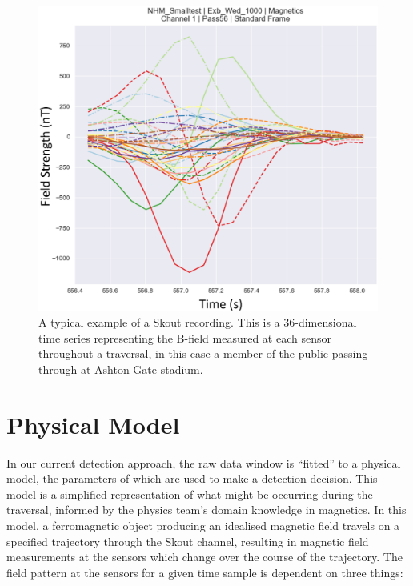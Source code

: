 \documentclass[10pt, a4paper, twocolumn]{article} %
\begin{document}
\begin{figure}
	\includegraphics[width=\linewidth]{Figures/example_data.png} %
	\caption{A typical example of a Skout recording. This is a 36-dimensional time series representing the B-field measured at each sensor throughout a traversal, in this case a member of the public passing through at Ashton Gate stadium.}
	\label{Skout_ref_data}
\end{figure}


\section{Physical Model}

In our current detection approach, the raw data window is “fitted” to a physical model, the parameters of which are used to make a detection decision. This model is a simplified representation of what might be occurring during the traversal, informed by the physics team's domain knowledge in magnetics. In this model, a ferromagnetic object producing an idealised magnetic field travels on a specified trajectory through the Skout channel, resulting in magnetic field measurements at the sensors which change over the course of the trajectory. The field pattern at the sensors for a given time sample is dependent on three things:
\end{document}
